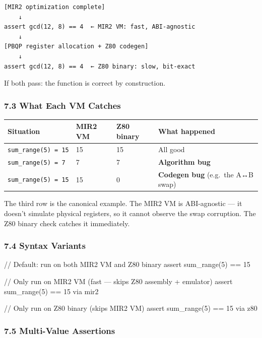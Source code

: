 \documentclass[
  11pt,
  a4paper,
]{report}
\newenvironment{Shaded}{\begin{snugshade}\small}{\end{snugshade}}
\newcommand{\NormalTok}[1]{#1}
\begin{document}
\begin{verbatim}
[MIR2 optimization complete]
    ↓
assert gcd(12, 8) == 4  ← MIR2 VM: fast, ABI-agnostic
    ↓
[PBQP register allocation + Z80 codegen]
    ↓
assert gcd(12, 8) == 4  ← Z80 binary: slow, bit-exact
\end{verbatim}

If both pass: the function is correct by construction.

\subsubsection{7.3 What Each VM Catches}\label{what-each-vm-catches}

\begin{longtable}[]{@{}llll@{}}
\toprule\noalign{}
Situation & MIR2 VM & Z80 binary & What happened \\
\midrule\noalign{}
\endhead
\bottomrule\noalign{}
\endlastfoot
\texttt{sum\_range(5)\ =\ 15} & 15 & 15 & All good \\
\texttt{sum\_range(5)\ =\ 7} & 7 & 7 & \textbf{Algorithm bug} \\
\texttt{sum\_range(5)\ =\ 15} & 15 & 0 & \textbf{Codegen bug} (e.g.~the
A↔B swap) \\
\end{longtable}

The third row is the canonical example. The MIR2 VM is ABI-agnostic ---
it doesn't simulate physical registers, so it cannot observe the swap
corruption. The Z80 binary check catches it immediately.

\subsubsection{7.4 Syntax Variants}\label{syntax-variants}

\begin{Shaded}
\begin{Highlighting}[]
\NormalTok{// Default: run on both MIR2 VM and Z80 binary}
\NormalTok{assert sum\_range(5) == 15}

\NormalTok{// Only run on MIR2 VM (fast — skips Z80 assembly + emulator)}
\NormalTok{assert sum\_range(5) == 15 via mir2}

\NormalTok{// Only run on Z80 binary (skips MIR2 VM)}
\NormalTok{assert sum\_range(5) == 15 via z80}
\end{Highlighting}
\end{Shaded}

\subsubsection{7.5 Multi-Value Assertions}\label{multi-value-assertions}
\end{document}

